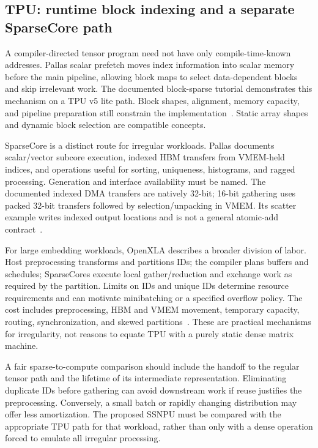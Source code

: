 \subsection{TPU: runtime block indexing and a separate SparseCore path}

A compiler-directed tensor program need not have only compile-time-known addresses. Pallas scalar prefetch moves index information into scalar memory before the main pipeline, allowing block maps to select data-dependent blocks and skip irrelevant work. The documented block-sparse tutorial demonstrates this mechanism on a TPU v5 lite path. Block shapes, alignment, memory capacity, and pipeline preparation still constrain the implementation~\citep{u004_pallas_sparse}. Static array shapes and dynamic block selection are compatible concepts.

SparseCore is a distinct route for irregular workloads. Pallas documents scalar/vector subcore execution, indexed HBM transfers from VMEM-held indices, and operations useful for sorting, uniqueness, histograms, and ragged processing. Generation and interface availability must be named. The documented indexed DMA transfers are natively 32-bit; 16-bit gathering uses packed 32-bit transfers followed by selection/unpacking in VMEM. Its scatter example writes indexed output locations and is not a general atomic-add contract~\citep{u004_pallas_sparsecore}.

For large embedding workloads, OpenXLA describes a broader division of labor. Host preprocessing transforms and partitions IDs; the compiler plans buffers and schedules; SparseCores execute local gather/reduction and exchange work as required by the partition. Limits on IDs and unique IDs determine resource requirements and can motivate minibatching or a specified overflow policy. The cost includes preprocessing, HBM and VMEM movement, temporary capacity, routing, synchronization, and skewed partitions~\citep{u004_xla_sparsecore}. These are practical mechanisms for irregularity, not reasons to equate TPU with a purely static dense matrix machine.

A fair sparse-to-compute comparison should include the handoff to the regular tensor path and the lifetime of its intermediate representation. Eliminating duplicate IDs before gathering can avoid downstream work if reuse justifies the preprocessing. Conversely, a small batch or rapidly changing distribution may offer less amortization. The proposed SSNPU must be compared with the appropriate TPU path for that workload, rather than only with a dense operation forced to emulate all irregular processing.

